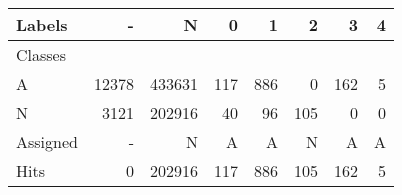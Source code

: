 \begin{tabular}{l|r|r|r|r|r|r|r}

Labels &      - &       N &    0 &    1 &    2 &    3 &  4 \\\hline
Classes  &        &         &      &      &      &      &    \\\hline
\hline
A        &  12378 &  433631 &  117 &  886 &    0 &  162 &  5 \\\hline
N        &   3121 &  202916 &   40 &   96 &  105 &    0 &  0 \\\hline
\hline
Assigned &      - &       N &    A &    A &    N &    A &  A \\\hline
Hits     &      0 &  202916 &  117 &  886 &  105 &  162 &  5 
\end{tabular}


